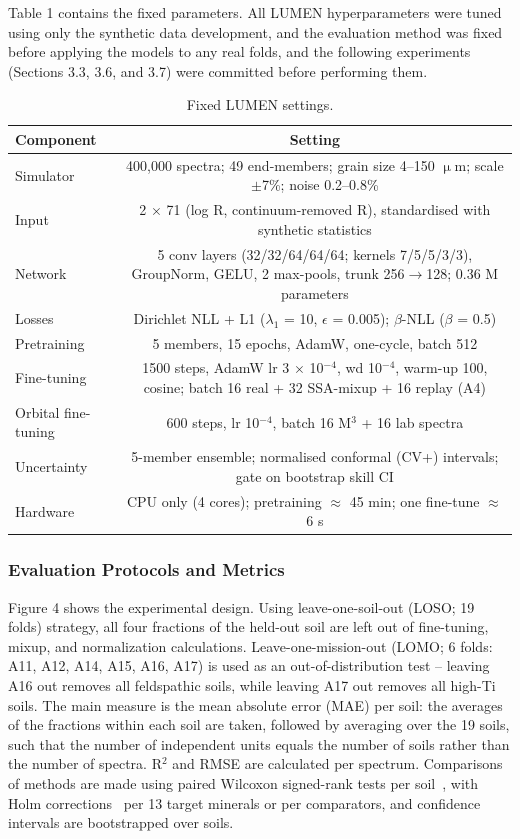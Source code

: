 \documentclass[remotesensing,article,submit,pdftex,moreauthors]{Definitions/mdpi}
\begin{document}
Table 1 contains the fixed parameters. All LUMEN hyperparameters were tuned using only the synthetic data development, and the evaluation method was fixed before applying the models to any real folds, and the following experiments (Sections 3.3, 3.6, and 3.7) were committed before performing them.

\begin{table}[H]
\caption{Fixed LUMEN settings.\label{tab1}}
\small
\begin{tabularx}{\textwidth}{LC}
\toprule
\textbf{Component} & \textbf{Setting} \\
\midrule
Simulator & 400,000 spectra; 49 end-members; grain size 4--150 $\upmu$m; scale $\pm$7\%; noise 0.2--0.8\% \\
Input & 2 $\times$ 71 (log R, continuum-removed R), standardised with synthetic statistics \\
Network & 5 conv layers (32/32/64/64/64; kernels 7/5/5/3/3), GroupNorm, GELU, 2 max-pools, trunk 256$\rightarrow$128; 0.36 M parameters \\
Losses & Dirichlet NLL + L1 ($\lambda_{1}$ = 10, $\epsilon$ = 0.005); $\beta$-NLL ($\beta$ = 0.5) \\
Pretraining & 5 members, 15 epochs, AdamW, one-cycle, batch 512 \\
Fine-tuning & 1500 steps, AdamW lr 3 $\times$ 10$^{-4}$, wd 10$^{-4}$, warm-up 100, cosine; batch 16 real + 32 SSA-mixup + 16 replay (A4) \\
Orbital fine-tuning & 600 steps, lr 10$^{-4}$, batch 16 M$^{3}$ + 16 lab spectra \\
Uncertainty & 5-member ensemble; normalised conformal (CV+) intervals; gate on bootstrap skill CI \\
Hardware & CPU only (4 cores); pretraining $\approx$ 45 min; one fine-tune $\approx$ 6 s \\
\bottomrule
\end{tabularx}
\end{table}

\subsubsection{Evaluation Protocols and Metrics}

Figure 4 shows the experimental design. Using leave-one-soil-out (LOSO; 19 folds) strategy, all four fractions of the held-out soil are left out of fine-tuning, mixup, and normalization calculations. Leave-one-mission-out (LOMO; 6 folds: A11, A12, A14, A15, A16, A17) is used as an out-of-distribution test -- leaving A16 out removes all feldspathic soils, while leaving A17 out removes all high-Ti soils. The main measure is the mean absolute error (MAE) per soil: the averages of the fractions within each soil are taken, followed by averaging over the 19 soils, such that the number of independent units equals the number of soils rather than the number of spectra. R$^{2}$ and RMSE are calculated per spectrum. Comparisons of methods are made using paired Wilcoxon signed-rank tests per soil~\cite{wilcoxon1945}, with Holm corrections~\cite{holm1979} per 13 target minerals or per comparators, and confidence intervals are bootstrapped over soils.
\end{document}
